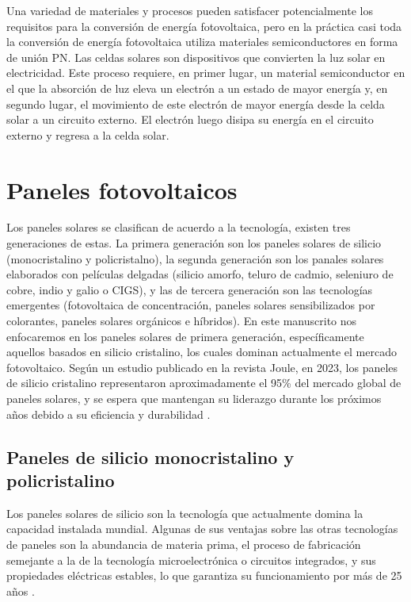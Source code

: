 Una variedad de materiales y procesos pueden satisfacer potencialmente los requisitos para la conversión de energía fotovoltaica, pero en la práctica casi toda la conversión de energía fotovoltaica utiliza materiales semiconductores en forma de unión PN. Las celdas solares son dispositivos que convierten la luz solar en electricidad. Este proceso requiere, en primer lugar, un material semiconductor en el que la absorción de luz eleva un electrón a un estado de mayor energía y, en segundo lugar, el movimiento de este electrón de mayor energía desde la celda solar a un circuito externo. El electrón luego disipa su energía en el circuito externo y regresa a la celda solar.   

\section{Paneles fotovoltaicos}
\label{sec:paneles}

 Los paneles solares se clasifican de acuerdo a la tecnología, existen tres generaciones de estas. La primera generación son los paneles solares de silicio (monocristalino y policristalno), la segunda generación son los panales solares elaborados con películas delgadas (silicio amorfo, teluro de cadmio, seleniuro de cobre, indio y galio o CIGS), y las de tercera generación son las tecnologías emergentes (fotovoltaica de concentración, paneles solares sensibilizados por colorantes, paneles solares orgánicos e híbridos)\citep{Xu2012}. En este manuscrito nos enfocaremos en los paneles solares de primera generación, específicamente aquellos basados en silicio cristalino, los cuales dominan actualmente el mercado fotovoltaico. Según un estudio publicado en la revista Joule, en 2023, los paneles de silicio cristalino representaron aproximadamente el 95\% del mercado global de paneles solares, y se espera que mantengan su liderazgo durante los próximos años debido a su eficiencia y durabilidad \citep{ITRPV2023}. 
 
 \subsection{Paneles de silicio monocristalino y policristalino}
 \label{sec:Silicio monocristalino y policristalino}
 
 Los paneles solares de silicio son la tecnología que actualmente domina la capacidad instalada mundial. Algunas de sus ventajas sobre las otras tecnologías de paneles son la abundancia de materia prima, el proceso de fabricación semejante a la de la tecnología microelectrónica o circuitos integrados, y sus propiedades eléctricas estables, lo que garantiza su funcionamiento por más de 25 años \citep{ITRPV2023, Yasuhiro2011}.   
 
